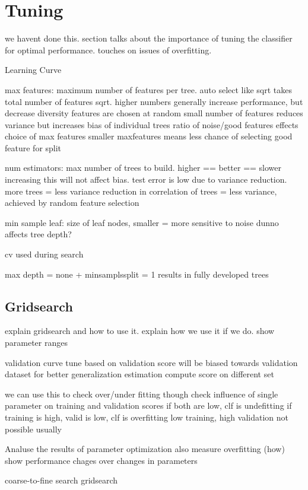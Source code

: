 \section{Tuning}\label{sec:tuning}
we havent done this.
section talks about the importance of tuning the classifier for
optimal performance.
touches on issues of overfitting.

Learning Curve

max features: maximum number of features per tree. auto select like sqrt takes 
total number of features sqrt.
higher numbers generally increase performance, but decrease diversity
features are chosen at random
small number of features reduces variance but increases bias of individual trees
ratio of noise/good features effects choice of max features
smaller maxfeatures means less chance of selecting good feature for split

num estimators: max number of trees to build. higher == better == slower
increasing this will not affect bias. test error is low due to variance reduction.
more trees = less variance
reduction in correlation of trees = less variance, achieved by random feature
selection

min sample leaf: size of leaf nodes, smaller = more sensitive to noise
dunno
affects tree depth?


cv used during search

max depth = none + minsamplssplit = 1 results in fully developed trees




\subsection{Gridsearch}
explain gridsearch and how to use it.
explain how we use it if we do.
show parameter ranges

validation curve
tune based on validation score
will be biased towards validation dataset
for better generalization estimation compute score on different set

we can use this to check over/under fitting though
check influence of single parameter on training and validation scores
if both are low, clf is undefitting
if training is high, valid is low, clf is overfitting
low training, high validation not possible usually

Analuse the results of parameter optimization
also measure overfitting (how)
show performance chages over changes in parameters

coarse-to-fine search gridsearch

